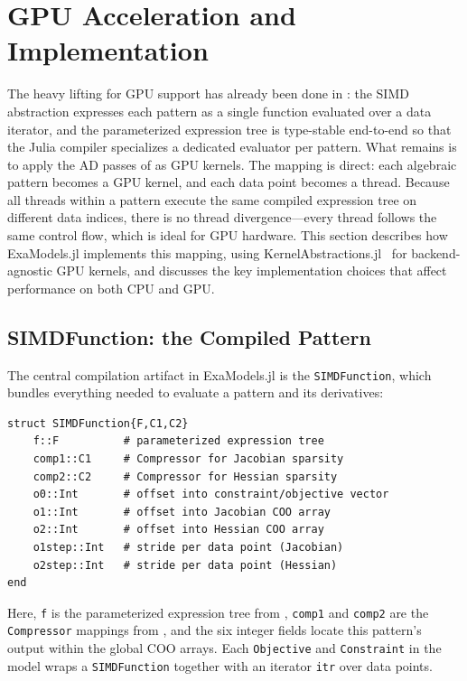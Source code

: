 \documentclass[11pt]{article}
\begin{document}
\section{GPU Acceleration and Implementation}
\label{sec:gpu}

The heavy lifting for GPU support has already been done in : the SIMD abstraction expresses each pattern as a single function evaluated over a data iterator, and the parameterized expression tree is type-stable end-to-end so that the Julia compiler specializes a dedicated evaluator per pattern. What remains is to apply the AD passes of  as GPU kernels. The mapping is direct: each algebraic pattern becomes a GPU kernel, and each data point becomes a thread. Because all threads within a pattern execute the same compiled expression tree on different data indices, there is no thread divergence---every thread follows the same control flow, which is ideal for GPU hardware. This section describes how ExaModels.jl implements this mapping, using KernelAbstractions.jl~\citep{churavyKernelAbstractionsjl2025} for backend-agnostic GPU kernels, and discusses the key implementation choices that affect performance on both CPU and GPU.

\subsection{SIMDFunction: the Compiled Pattern}
\label{sec:gpu:simdfunction}

The central compilation artifact in ExaModels.jl is the \texttt{SIMDFunction}, which bundles everything needed to evaluate a pattern and its derivatives:
\begin{lstlisting}
struct SIMDFunction{F,C1,C2}
    f::F          # parameterized expression tree
    comp1::C1     # Compressor for Jacobian sparsity
    comp2::C2     # Compressor for Hessian sparsity
    o0::Int       # offset into constraint/objective vector
    o1::Int       # offset into Jacobian COO array
    o2::Int       # offset into Hessian COO array
    o1step::Int   # stride per data point (Jacobian)
    o2step::Int   # stride per data point (Hessian)
end
\end{lstlisting}
Here, \texttt{f} is the parameterized expression tree from , \texttt{comp1} and \texttt{comp2} are the \texttt{Compressor} mappings from , and the six integer fields locate this pattern's output within the global COO arrays. Each \texttt{Objective} and \texttt{Constraint} in the model wraps a \texttt{SIMDFunction} together with an iterator \texttt{itr} over data points.
\end{document}
